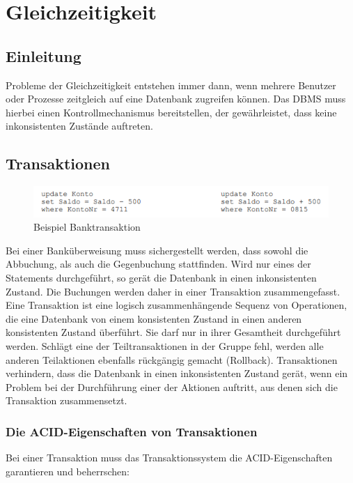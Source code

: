 \chapter{Gleichzeitigkeit}\label{cha:gleichzeitigkeit}

\section{Einleitung}
Probleme der Gleichzeitigkeit entstehen immer dann, wenn mehrere Benutzer oder Prozesse zeitgleich auf eine Datenbank zugreifen können. Das DBMS muss hierbei einen Kontrollmechanismus bereitstellen, der gewährleistet, dass keine inkonsistenten Zustände auftreten.

\section{Transaktionen}
\begin{figure}[H]
\centering
    \includegraphics[width=.75\textwidth]{Content/images/gleichzeitigkeit/banktransaktion.png}
    \caption{Beispiel Banktransaktion}
\end{figure}
\noindent
Bei einer Banküberweisung muss sichergestellt werden, dass sowohl die Abbuchung, als auch die Gegenbuchung stattfinden. Wird nur eines der Statements durchgeführt, so gerät die Datenbank in einen inkonsistenten Zustand. Die Buchungen werden daher in einer Transaktion zusammengefasst. Eine Transaktion ist eine logisch zusammenhängende Sequenz von Operationen, die eine Datenbank von einem konsistenten Zustand in einen anderen konsistenten Zustand überführt. Sie darf nur in ihrer Gesamtheit durchgeführt werden.  Schlägt eine der Teiltransaktionen in der Gruppe fehl, werden alle anderen Teilaktionen ebenfalls rückgängig gemacht (Rollback). Transaktionen verhindern, dass die Datenbank in einen inkonsistenten Zustand gerät, wenn ein Problem bei der Durchführung einer der Aktionen auftritt, aus denen sich die Transaktion zusammensetzt.

\subsection{Die ACID-Eigenschaften von Transaktionen}
Bei einer Transaktion muss das Transaktionssystem die ACID-Eigenschaften garantieren und beherrschen:


